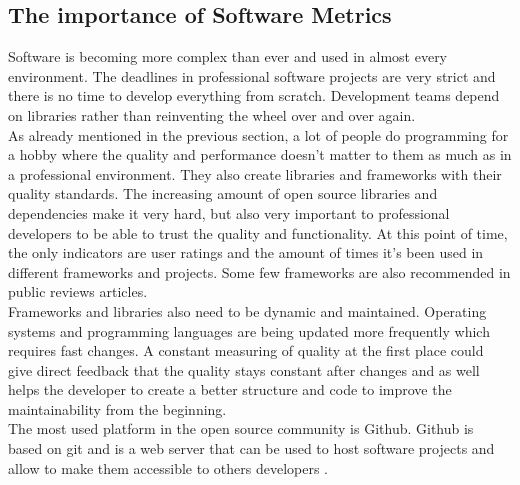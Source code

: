 \subsection{The importance of Software Metrics}
Software is becoming more complex than ever and used in almost every environment. The deadlines in professional software projects are very strict and there is no time to develop everything from scratch. Development teams depend on libraries rather than reinventing the wheel over and over again. \\
As already mentioned in the previous section, a lot of people do programming for a hobby where the quality and performance doesn't matter to them as much as in a professional environment. They also create libraries and frameworks with their quality standards. The increasing amount of open source libraries and dependencies make it very hard, but also very important to professional developers to be able to trust the quality and functionality. At this point of time, the only indicators are user ratings and the amount of times it's been used in different frameworks and projects. Some few frameworks are also recommended in public reviews articles. \\
Frameworks and libraries also need to be dynamic and maintained. Operating systems and programming languages are being updated more frequently which requires fast changes. A constant measuring of quality at the first place could give direct feedback that the quality stays constant after changes and as well helps the developer to create a better structure and code to improve the maintainability from the beginning. \\
The most used platform in the open source community is Github. Github is based on git and is a web server that can be used to host software projects and allow to make them accessible to others developers  \cite{dabbish2012social}.

